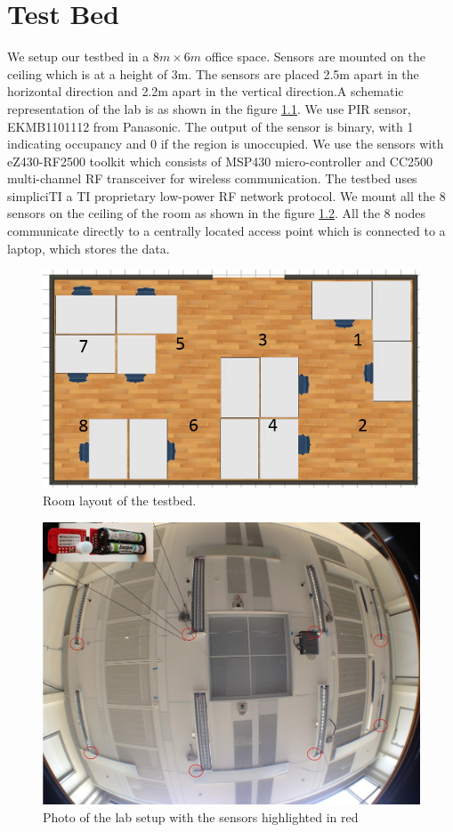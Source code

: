 \chapter{Test Bed}
\label{chp:testbed}
We setup our testbed in a $8m\times6m$ office space. Sensors are mounted on the ceiling which is at a height of 3m. The sensors are  placed 2.5m apart in the horizontal direction and 2.2m apart in the vertical direction.A schematic representation of the lab is as shown in the figure \ref{fig:roomLayout}. We use  PIR sensor, EKMB1101112 from Panasonic. 
The output of the sensor is binary, with 1 indicating occupancy and 0 if the region is unoccupied.  We use the sensors with eZ430-RF2500 toolkit which consists of MSP430 micro-controller  and CC2500 multi-channel
RF transceiver for wireless communication. The testbed uses simpliciTI a TI proprietary  low-power RF network protocol.  We mount all the 8 sensors on the ceiling of the room as shown in the figure \ref{fig:photo}. 
 All the 8 nodes communicate directly to a centrally located access point which is connected to a laptop, which stores the data.

\begin{figure}[!ht]
\centering
\includegraphics[scale=0.5]{./pics/roomLayout.png}
\caption{Room layout of the testbed.}
\label{fig:roomLayout}
\end{figure}


\begin{figure}[!ht]
\includegraphics[scale=0.5]{./pics/lab_photo.jpg}
\caption{Photo of the lab setup with the sensors highlighted in red}
\label{fig:photo}
\end{figure}

